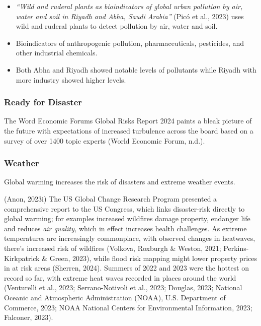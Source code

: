 \documentclass[
  letterpaper,
  DIV=11,
  numbers=noendperiod]{scrartcl}
\providecommand{\tightlist}{%
  \setlength{\itemsep}{0pt}\setlength{\parskip}{0pt}}\usepackage{longtable,booktabs,array}
\begin{document}
\begin{itemize}
\tightlist
\item
  \emph{``Wild and ruderal plants as bioindicators of global urban
  pollution by air, water and soil in Riyadh and Abha, Saudi Arabia''}
  (Picó et al., 2023) uses wild and ruderal plants to detect pollution
  by air, water and soil.
\item
  Bioindicators of anthropogenic pollution, pharmaceuticals, pesticides,
  and other industrial chemicals.
\item
  Both Abha and Riyadh showed notable levels of pollutants while Riyadh
  with more industry showed higher levels.
\end{itemize}

\subsubsection{Ready for Disaster}\label{ready-for-disaster}

The Word Economic Forums Global Risks Report 2024 paints a bleak picture
of the future with expectations of increased turbulence across the board
based on a survey of over 1400 topic experts (World Economic Forum,
n.d.).

\subsubsection{Weather}\label{weather}

Global warming increases the risk of disasters and extreme weather
events.

(Anon, 2023i) The US Global Change Research Program presented a
comprehensive report to the US Congress, which links disaster-risk
directly to global warming; for examples increased wildfires damage
property, endanger life and reduces \emph{air quality,} which in effect
increases health challenges. As extreme temperatures are increasingly
commonplace, with observed changes in heatwaves, there's increased risk
of wildfires (Volkova, Roxburgh \& Weston, 2021; Perkins-Kirkpatrick \&
Green, 2023), while flood risk mapping might lower property prices in at
risk areas (Sherren, 2024). Summers of 2022 and 2023 were the hottest on
record so far, with extreme heat waves recorded in places around the
world (Venturelli et al., 2023; Serrano-Notivoli et al., 2023; Douglas,
2023; National Oceanic and Atmospheric Administration (NOAA), U.S.
Department of Commerce, 2023; NOAA National Centers for Environmental
Information, 2023; Falconer, 2023).
\end{document}
